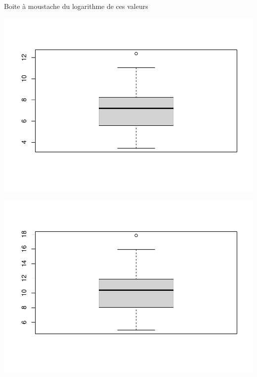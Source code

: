 \documentclass[
]{book}
\newenvironment{Shaded}{\begin{snugshade}}{\end{snugshade}}
\newcommand{\FunctionTok}[1]{\textcolor[rgb]{0.00,0.00,0.00}{#1}}
\newcommand{\NormalTok}[1]{#1}
\newcommand{\SpecialCharTok}[1]{\textcolor[rgb]{0.00,0.00,0.00}{#1}}
\begin{document}
Boite à moustache du logarithme de ces valeurs

\begin{Shaded}
\end{Shaded}

\includegraphics{images/unnamed-chunk-78-1.pdf}

\begin{Shaded}
\end{Shaded}

\includegraphics{images/unnamed-chunk-79-1.pdf}
\end{document}
